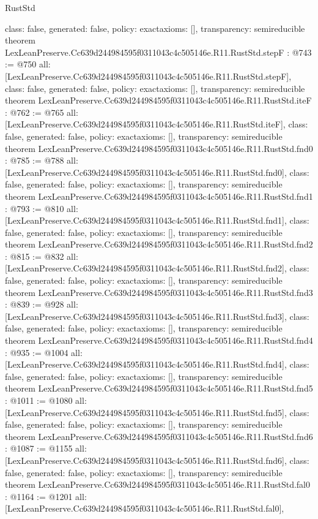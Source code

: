 \begin{lexlean}{RustStd}
\begin{coremodule}
{  class: false,
  generated: false,
  policy: exact{axioms: []},
  transparency: semireducible
}
theorem LexLeanPreserve.Cc639d244984595f0311043c4c505146e.R11.RustStd.stepF : @743 := @750 {
  all: [LexLeanPreserve.Cc639d244984595f0311043c4c505146e.R11.RustStd.stepF],
  class: false,
  generated: false,
  policy: exact{axioms: []},
  transparency: semireducible
}
theorem LexLeanPreserve.Cc639d244984595f0311043c4c505146e.R11.RustStd.iteF : @762 := @765 {
  all: [LexLeanPreserve.Cc639d244984595f0311043c4c505146e.R11.RustStd.iteF],
  class: false,
  generated: false,
  policy: exact{axioms: []},
  transparency: semireducible
}
theorem LexLeanPreserve.Cc639d244984595f0311043c4c505146e.R11.RustStd.fnd0 : @785 := @788 {
  all: [LexLeanPreserve.Cc639d244984595f0311043c4c505146e.R11.RustStd.fnd0],
  class: false,
  generated: false,
  policy: exact{axioms: []},
  transparency: semireducible
}
theorem LexLeanPreserve.Cc639d244984595f0311043c4c505146e.R11.RustStd.fnd1 : @793 := @810 {
  all: [LexLeanPreserve.Cc639d244984595f0311043c4c505146e.R11.RustStd.fnd1],
  class: false,
  generated: false,
  policy: exact{axioms: []},
  transparency: semireducible
}
theorem LexLeanPreserve.Cc639d244984595f0311043c4c505146e.R11.RustStd.fnd2 : @815 := @832 {
  all: [LexLeanPreserve.Cc639d244984595f0311043c4c505146e.R11.RustStd.fnd2],
  class: false,
  generated: false,
  policy: exact{axioms: []},
  transparency: semireducible
}
theorem LexLeanPreserve.Cc639d244984595f0311043c4c505146e.R11.RustStd.fnd3 : @839 := @928 {
  all: [LexLeanPreserve.Cc639d244984595f0311043c4c505146e.R11.RustStd.fnd3],
  class: false,
  generated: false,
  policy: exact{axioms: []},
  transparency: semireducible
}
theorem LexLeanPreserve.Cc639d244984595f0311043c4c505146e.R11.RustStd.fnd4 : @935 := @1004 {
  all: [LexLeanPreserve.Cc639d244984595f0311043c4c505146e.R11.RustStd.fnd4],
  class: false,
  generated: false,
  policy: exact{axioms: []},
  transparency: semireducible
}
theorem LexLeanPreserve.Cc639d244984595f0311043c4c505146e.R11.RustStd.fnd5 : @1011 := @1080 {
  all: [LexLeanPreserve.Cc639d244984595f0311043c4c505146e.R11.RustStd.fnd5],
  class: false,
  generated: false,
  policy: exact{axioms: []},
  transparency: semireducible
}
theorem LexLeanPreserve.Cc639d244984595f0311043c4c505146e.R11.RustStd.fnd6 : @1087 := @1155 {
  all: [LexLeanPreserve.Cc639d244984595f0311043c4c505146e.R11.RustStd.fnd6],
  class: false,
  generated: false,
  policy: exact{axioms: []},
  transparency: semireducible
}
theorem LexLeanPreserve.Cc639d244984595f0311043c4c505146e.R11.RustStd.fal0 : @1164 := @1201 {
  all: [LexLeanPreserve.Cc639d244984595f0311043c4c505146e.R11.RustStd.fal0],
}
\end{coremodule}
\end{lexlean}
